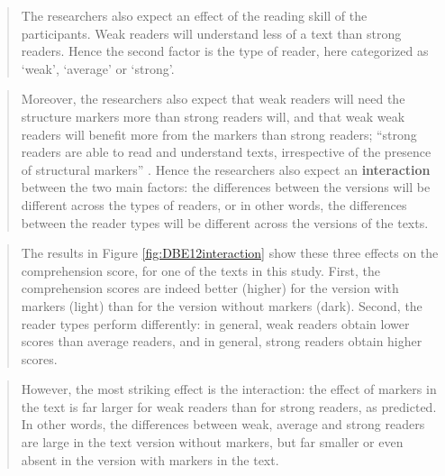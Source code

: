 \documentclass[
]{book}
\begin{document}
\begin{quote}
The researchers also expect an effect of the reading skill of the participants. Weak readers will understand less of a text than strong readers. Hence the second factor is the type of reader, here categorized as `weak', `average' or `strong'.
\end{quote}

\begin{quote}
Moreover, the researchers also expect that weak readers will need the structure markers more than strong readers will, and that weak weak readers will benefit more from the markers than strong readers; ``strong readers are able to read and understand texts, irrespective of the presence of structural markers'' \citep[p.33, transl.HQ]{DBE12}.
Hence the researchers also expect an \textbf{interaction} between the two main factors: the differences between the versions will be different across the types of readers, or in other words, the differences between the reader types will be different across the versions of the texts.
\end{quote}

\begin{quote}
The results in Figure \ref{fig:DBE12interaction} show these three effects on the comprehension score, for one of the texts in this study. First, the comprehension scores are indeed better (higher) for the version with markers (light) than for the version without markers (dark). Second, the reader types perform differently: in general, weak readers obtain lower scores than average readers, and in general, strong readers obtain higher scores.
\end{quote}

\begin{quote}
However, the most striking effect is the interaction: the effect of markers in the text is far larger for weak readers than for strong readers, as predicted. In other words, the differences between weak, average and strong readers are large in the text version without markers, but far smaller or even absent in the version with markers in the text.
\end{quote}
\end{document}
